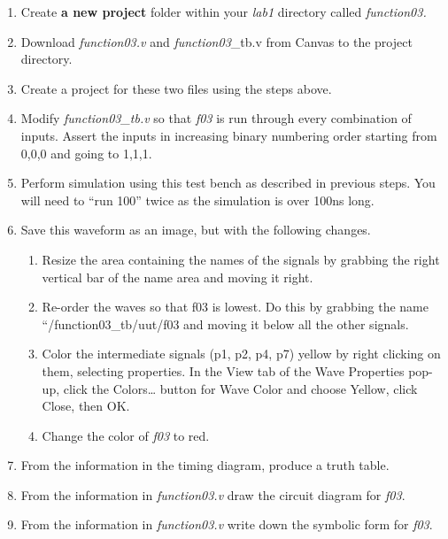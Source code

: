 \begin{enumerate}
        \def\labelenumi{\arabic{enumi}.}
    \item
        Create \textbf{a new project} folder within your \emph{lab1} directory
        called \emph{function03.}
    \item
        Download \emph{function03.v} and \emph{function03}\_tb.v from Canvas
        to the project directory.
    \item
        Create a project for these two files using the steps above.
    \item
        Modify \emph{function03\_tb.v} so that \emph{f03} is run through every
        combination of inputs. Assert the inputs in increasing binary
        numbering order starting from 0,0,0 and going to 1,1,1.
    \item
        Perform simulation using this test bench as described in previous
        steps. You will need to ``run 100'' twice as the simulation is over
        100ns long.
    \item
        \protect\hypertarget{Part_3_Step_6}{}{}Save this waveform as an image,
        but with the following changes.

        \begin{enumerate}
                \def\labelenumii{\alph{enumii}.}
            \item
                Resize the area containing the names of the signals by grabbing the
                right vertical bar of the name area and moving it right.
            \item
                Re-order the waves so that f03 is lowest. Do this by grabbing the
                name ``/function03\_tb/uut/f03 and moving it below all the other
                signals.
            \item
                Color the intermediate signals (p1, p2, p4, p7) yellow by right
                clicking on them, selecting properties. In the View tab of the Wave
                Properties pop-up, click the Colors\ldots{} button for Wave Color
                and choose Yellow, click Close, then OK.
            \item
                Change the color of \emph{f03} to red.
        \end{enumerate}
    \item
        \protect\hypertarget{Part_3_Step_7}{}{}From the information in the
        timing diagram, produce a truth table.
    \item
        \protect\hypertarget{Part_3_Step_8}{}{}From the information in
        \emph{function03.v} draw the circuit diagram for \emph{f03}.
    \item
        \protect\hypertarget{Part_3_Step_9}{}{}From the information in
        \emph{function03.v} write down the symbolic form for \emph{f03}.
\end{enumerate}

